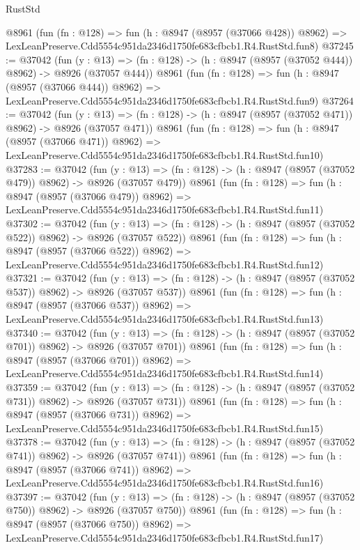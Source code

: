 \begin{lexlean}{RustStd}
\begin{coremodule}
    @8961
    (fun (fn : @128) =>
    fun (h : @8947 (@8957 (@37066 @428)) @8962) =>
    LexLeanPreserve.Cdd5554c951da2346d1750fe683cfbcb1.R4.RustStd.fun8)
@37245 := @37042
    (fun (y : @13) => (fn : @128) -> (h : @8947 (@8957 (@37052 @444)) @8962) -> @8926 (@37057 @444))
    @8961
    (fun (fn : @128) =>
    fun (h : @8947 (@8957 (@37066 @444)) @8962) =>
    LexLeanPreserve.Cdd5554c951da2346d1750fe683cfbcb1.R4.RustStd.fun9)
@37264 := @37042
    (fun (y : @13) => (fn : @128) -> (h : @8947 (@8957 (@37052 @471)) @8962) -> @8926 (@37057 @471))
    @8961
    (fun (fn : @128) =>
    fun (h : @8947 (@8957 (@37066 @471)) @8962) =>
    LexLeanPreserve.Cdd5554c951da2346d1750fe683cfbcb1.R4.RustStd.fun10)
@37283 := @37042
    (fun (y : @13) => (fn : @128) -> (h : @8947 (@8957 (@37052 @479)) @8962) -> @8926 (@37057 @479))
    @8961
    (fun (fn : @128) =>
    fun (h : @8947 (@8957 (@37066 @479)) @8962) =>
    LexLeanPreserve.Cdd5554c951da2346d1750fe683cfbcb1.R4.RustStd.fun11)
@37302 := @37042
    (fun (y : @13) => (fn : @128) -> (h : @8947 (@8957 (@37052 @522)) @8962) -> @8926 (@37057 @522))
    @8961
    (fun (fn : @128) =>
    fun (h : @8947 (@8957 (@37066 @522)) @8962) =>
    LexLeanPreserve.Cdd5554c951da2346d1750fe683cfbcb1.R4.RustStd.fun12)
@37321 := @37042
    (fun (y : @13) => (fn : @128) -> (h : @8947 (@8957 (@37052 @537)) @8962) -> @8926 (@37057 @537))
    @8961
    (fun (fn : @128) =>
    fun (h : @8947 (@8957 (@37066 @537)) @8962) =>
    LexLeanPreserve.Cdd5554c951da2346d1750fe683cfbcb1.R4.RustStd.fun13)
@37340 := @37042
    (fun (y : @13) => (fn : @128) -> (h : @8947 (@8957 (@37052 @701)) @8962) -> @8926 (@37057 @701))
    @8961
    (fun (fn : @128) =>
    fun (h : @8947 (@8957 (@37066 @701)) @8962) =>
    LexLeanPreserve.Cdd5554c951da2346d1750fe683cfbcb1.R4.RustStd.fun14)
@37359 := @37042
    (fun (y : @13) => (fn : @128) -> (h : @8947 (@8957 (@37052 @731)) @8962) -> @8926 (@37057 @731))
    @8961
    (fun (fn : @128) =>
    fun (h : @8947 (@8957 (@37066 @731)) @8962) =>
    LexLeanPreserve.Cdd5554c951da2346d1750fe683cfbcb1.R4.RustStd.fun15)
@37378 := @37042
    (fun (y : @13) => (fn : @128) -> (h : @8947 (@8957 (@37052 @741)) @8962) -> @8926 (@37057 @741))
    @8961
    (fun (fn : @128) =>
    fun (h : @8947 (@8957 (@37066 @741)) @8962) =>
    LexLeanPreserve.Cdd5554c951da2346d1750fe683cfbcb1.R4.RustStd.fun16)
@37397 := @37042
    (fun (y : @13) => (fn : @128) -> (h : @8947 (@8957 (@37052 @750)) @8962) -> @8926 (@37057 @750))
    @8961
    (fun (fn : @128) =>
    fun (h : @8947 (@8957 (@37066 @750)) @8962) =>
    LexLeanPreserve.Cdd5554c951da2346d1750fe683cfbcb1.R4.RustStd.fun17)

\end{coremodule}
\end{lexlean}

